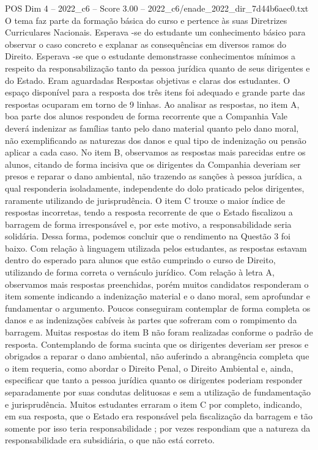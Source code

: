 \begin{textsample}{POS Dim 4 – 2022\_c6 – Score 3.00 – 2022\_c6/enade\_2022\_dir\_7d44b6aec0.txt}
O tema faz parte da formação básica do curso e pertence às suas Diretrizes Curriculares Nacionais.
Esperava -se do estudante um conhecimento básico para observar o caso concreto e explanar as consequências em diversos ramos do Direito.
Esperava -se que o estudante demonstrasse conhecimentos mínimos a respeito da responsabilização tanto da pessoa jurídica quanto de seus dirigentes e do Estado.
Eram aguardadas Respostas objetivas e claras dos estudantes.
O espaço disponível para a resposta dos três itens foi adequado e grande parte das respostas ocuparam em torno de 9 linhas.
Ao analisar as respostas, no item A, boa parte dos alunos respondeu de forma recorrente que a Companhia Vale deverá indenizar as famílias tanto pelo dano material quanto pelo dano moral, não exemplificando as naturezas dos danos e qual tipo de indenização ou pensão aplicar a cada caso.
No item B, observamos as respostas mais parecidas entre os alunos, citando de forma incisiva que os dirigentes da Companhia deveriam ser presos e reparar o dano ambiental, não trazendo as sanções à pessoa jurídica, a qual responderia isoladamente, independente do dolo praticado pelos dirigentes, raramente utilizando de jurisprudência.
O item C trouxe o maior índice de respostas incorretas, tendo a resposta recorrente de que o Estado fiscalizou a barragem de forma irresponsável e, por este motivo, a responsabilidade seria solidária.
Dessa forma, podemos concluir que o rendimento na Questão 3 foi baixo.
Com relação à linguagem utilizada pelos estudantes, as respostas estavam dentro do esperado para alunos que estão cumprindo o curso de Direito, utilizando de forma correta o vernáculo jurídico.
Com relação à letra A, observamos mais respostas preenchidas, porém muitos candidatos responderam o item somente indicando a indenização material e o dano moral, sem aprofundar e fundamentar o argumento.
Poucos conseguiram contemplar de forma completa os danos e as indenizações cabíveis às partes que sofreram com o rompimento da barragem.
Muitas respostas do item B não foram realizadas conforme o padrão de resposta.
Contemplando de forma sucinta que os dirigentes deveriam ser presos e obrigados a reparar o dano ambiental, não auferindo a abrangência completa que o item requeria, como abordar o Direito Penal, o Direito Ambiental e, ainda, especificar que tanto a pessoa jurídica quanto os dirigentes poderiam responder separadamente por suas condutas delituosas e sem a utilização de fundamentação e jurisprudência.
Muitos estudantes erraram o item C por completo, indicando, em sua resposta, que o Estado era responsável pela fiscalização da barragem e tão somente por isso teria responsabilidade ; por vezes respondiam que a natureza da responsabilidade era subsidiária, o que não está correto.

\end{textsample}
